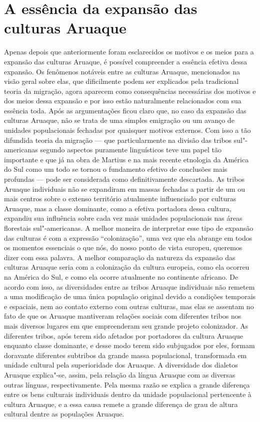 
\chapter{A essência da expansão das culturas Aruaque}

Apenas depois que anteriormente foram esclarecidos os motivos e os meios
para a expansão das culturas Aruaque, é possível compreender a essência
efetiva dessa expansão. Os fenômenos notáveis entre as culturas Aruaque,
mencionados na visão geral sobre elas, que dificilmente podem ser
explicados pela tradicional teoria da migração, agora aparecem como
consequências necessárias dos motivos e dos meios dessa expansão e por
isso estão naturalmente relacionados com sua essência toda. Após as
argumentações ficou claro que, no caso da expansão das culturas
Aruaque, não se trata de uma simples emigração ou um avanço de unidades
populacionais fechadas por quaisquer motivos externos. Com isso a tão
difundida teoria da migração --- que particularmente na divisão das
tribos sul"-americanas segundo aspectos puramente linguísticos teve um
papel tão importante e que já na obra de Martius e na mais recente
etnologia da América do Sul como um todo se tornou o fundamento efetivo
de conclusões mais profundas --- pode ser considerada como
definitivamente descartada. As tribos Aruaque individuais não se
expandiram em massas fechadas a partir de um ou mais centros sobre o
extenso território atualmente influenciado por culturas Aruaque, mas a
classe dominante, como a efetiva portadora dessa cultura, expandiu sua
influência sobre cada vez mais unidades populacionais nas áreas
florestais sul"-americanas. A melhor maneira de interpretar esse tipo de
expansão das culturas é com a expressão ``colonização'', uma vez que
ela abrange em todos os momentos essenciais o que nós, do nosso ponto de
vista europeu, queremos dizer com essa palavra. A melhor comparação da
natureza da expansão das culturas Aruaque seria com a colonização da
cultura europeia, como ela ocorreu na América do Sul, e como ela ocorre
atualmente no continente africano. De acordo com isso, as diversidades
entre as tribos Aruaque individuais não remetem a uma modificação de uma
única população original devido a condições temporais e espaciais, nem
ao contato externo com outras culturas, mas elas se assentam no fato de
que os Aruaque mantiveram relações sociais com diferentes tribos nos
mais diversos lugares em que empreenderam seu grande projeto
colonizador. As diferentes tribos, após terem sido afetados por
portadores da cultura Aruaque enquanto classe dominante, e desse modo
terem sido subjugados por eles, formam doravante diferentes subtribos da
grande massa populacional, transformada em unidade cultural pela
superioridade dos Aruaque. A diversidade dos dialetos Aruaque
explica"-se, assim, pela relação da língua Aruaque com as diversas outras
línguas, respectivamente. Pela mesma razão se explica a grande diferença
entre os bens culturais individuais dentro da unidade populacional
pertencente à cultura Aruaque, e a essa causa remete a grande diferença
de grau de altura cultural dentre as populações Aruaque.

